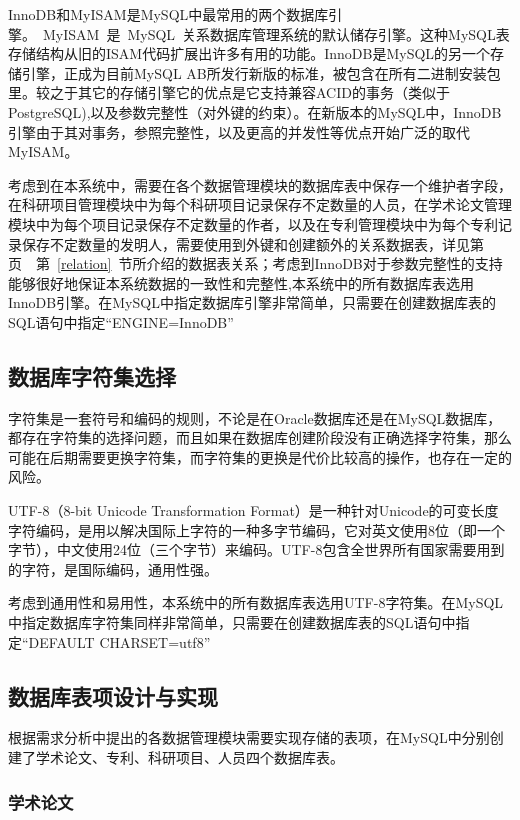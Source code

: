 InnoDB和MyISAM是MySQL中最常用的两个数据库引擎。~MyISAM~是~MySQL~关系数据库管理系统的默认储存引擎。这种MySQL表存储结构从旧的ISAM代码扩展出许多有用的功能。InnoDB是MySQL的另一个存储引擎，正成为目前MySQL AB所发行新版的标准，被包含在所有二进制安装包里。较之于其它的存储引擎它的优点是它支持兼容ACID的事务（类似于PostgreSQL),以及参数完整性（对外键的约束）。在新版本的MySQL中，InnoDB引擎由于其对事务，参照完整性，以及更高的并发性等优点开始广泛的取代MyISAM。

考虑到在本系统中，需要在各个数据管理模块的数据库表中保存一个维护者字段，在科研项目管理模块中为每个科研项目记录保存不定数量的人员，在学术论文管理模块中为每个项目记录保存不定数量的作者，以及在专利管理模块中为每个专利记录保存不定数量的发明人，需要使用到外键和创建额外的关系数据表，详见第页~\pageref{relation}~第~\ref{relation}~节所介绍的数据表关系；考虑到InnoDB对于参数完整性的支持能够很好地保证本系统数据的一致性和完整性,本系统中的所有数据库表选用InnoDB引擎。在MySQL中指定数据库引擎非常简单，只需要在创建数据库表的SQL语句中指定“ENGINE=InnoDB”

\subsection{数据库字符集选择}
\label{utf8}
字符集是一套符号和编码的规则，不论是在Oracle数据库还是在MySQL数据库，都存在字符集的选择问题，而且如果在数据库创建阶段没有正确选择字符集，那么可能在后期需要更换字符集，而字符集的更换是代价比较高的操作，也存在一定的风险。

UTF-8（8-bit Unicode Transformation Format）是一种针对Unicode的可变长度字符编码，是用以解决国际上字符的一种多字节编码，它对英文使用8位（即一个字节），中文使用24位（三个字节）来编码。UTF-8包含全世界所有国家需要用到的字符，是国际编码，通用性强。

考虑到通用性和易用性，本系统中的所有数据库表选用UTF-8字符集。在MySQL中指定数据库字符集同样非常简单，只需要在创建数据库表的SQL语句中指定“DEFAULT CHARSET=utf8”


\subsection{数据库表项设计与实现}
根据需求分析中提出的各数据管理模块需要实现存储的表项，在MySQL中分别创建了学术论文、专利、科研项目、人员四个数据库表。

\subsubsection{学术论文}

